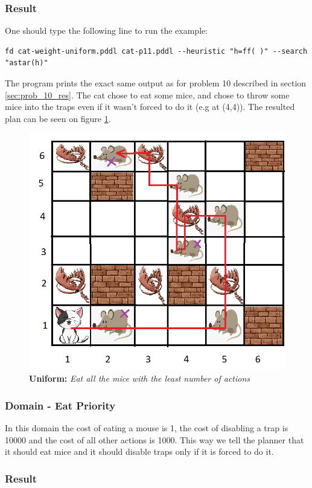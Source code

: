\subsubsection{Result}

One should type the following line to run the example: 

\begin{lstlisting}[numbers=none]
fd cat-weight-uniform.pddl cat-p11.pddl --heuristic "h=ff( )" --search "astar(h)"
\end{lstlisting}

The program prints the exact same output as for problem 10 described in section \ref{sec:prob_10_res}. The cat chose to eat some mice, and chose to throw some mice into the traps even if it wasn't forced to do it (e.g at (4,4)). The resulted plan can be seen on figure \ref{fig:cat_weight_uniform}.

\begin{figure}[H]
    \centering
    \includegraphics[width=.6\linewidth]{fig/A3/cat_10_sol.png}
    \caption{\textbf{Uniform:} \textit{Eat all the mice with the least number of actions}}
    \label{fig:cat_weight_uniform}
\end{figure}




\subsubsection{Domain - Eat Priority}

In this domain the cost of eating a mouse is 1, the cost of disabling a trap is 10000 and the cost of all other actions is 1000. This way we tell the planner that it should eat mice and it should disable traps only if it is forced to do it.

\subsubsection{Result}

